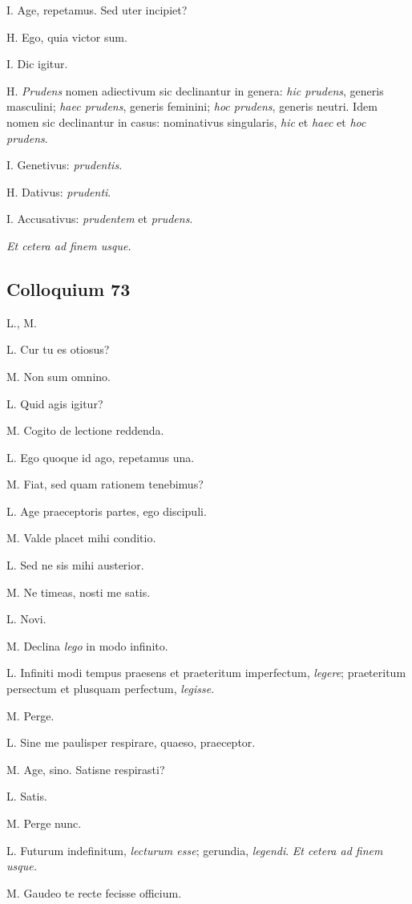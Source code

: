 \documentclass{article}
\begin{document}
I. Age, repetamus. Sed uter incipiet?

H. Ego, quia victor sum.

I. Dic igitur.

H. \emph{Prudens} nomen adiectivum sic declinantur in genera: \emph{hic prudens}, generis masculini; \emph{haec prudens}, generis feminini; \emph{hoc prudens}, generis neutri. Idem nomen sic declinantur in casus: nominativus singularis, \emph{hic} et \emph{haec} et \emph{hoc prudens}.

I. Genetivus: \emph{prudentis}.

H. Dativus: \emph{prudenti}.

I. Accusativus: \emph{prudentem} et \emph{prudens}.

\emph{Et cetera ad finem usque.}

\subsection{Colloquium 73}
L., M.

L. Cur tu es otiosus?

M. Non sum omnino.

L. Quid agis igitur?

M. Cogito de lectione reddenda.

L. Ego quoque id ago, repetamus una.

M. Fiat, sed quam rationem tenebimus?

L. Age praeceptoris partes, ego discipuli.

M. Valde placet mihi conditio.

L. Sed ne sis mihi austerior.

M. Ne timeas, nosti me satis.

L. Novi.

M. Declina \emph{lego} in modo infinito.

L. Infiniti modi tempus praesens et praeteritum imperfectum, \emph{legere}; praeteritum persectum et plusquam perfectum, \emph{legisse}.

M. Perge.

L. Sine me paulisper respirare, quaeso, praeceptor.

M. Age, sino. Satisne respirasti?

L. Satis.

M. Perge nunc.

L. Futurum indefinitum, \emph{lecturum esse}; gerundia, \emph{legendi}. \emph{Et cetera ad finem usque.}

M. Gaudeo te recte fecisse officium.
\end{document}
